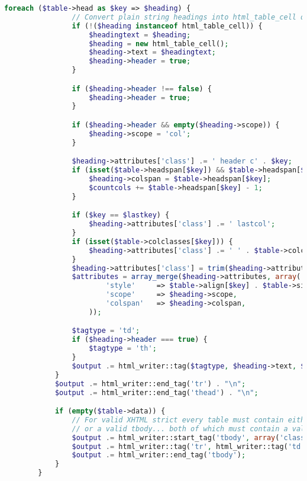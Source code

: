 \begin{lstlisting}[language=PHP]
            foreach ($table->head as $key => $heading) {
                // Convert plain string headings into html_table_cell objects
                if (!($heading instanceof html_table_cell)) {
                    $headingtext = $heading;
                    $heading = new html_table_cell();
                    $heading->text = $headingtext;
                    $heading->header = true;
                }

                if ($heading->header !== false) {
                    $heading->header = true;
                }

                if ($heading->header && empty($heading->scope)) {
                    $heading->scope = 'col';
                }

                $heading->attributes['class'] .= ' header c' . $key;
                if (isset($table->headspan[$key]) && $table->headspan[$key] > 1) {
                    $heading->colspan = $table->headspan[$key];
                    $countcols += $table->headspan[$key] - 1;
                }

                if ($key == $lastkey) {
                    $heading->attributes['class'] .= ' lastcol';
                }
                if (isset($table->colclasses[$key])) {
                    $heading->attributes['class'] .= ' ' . $table->colclasses[$key];
                }
                $heading->attributes['class'] = trim($heading->attributes['class']);
                $attributes = array_merge($heading->attributes, array(
                        'style'     => $table->align[$key] . $table->size[$key] . $heading->style,
                        'scope'     => $heading->scope,
                        'colspan'   => $heading->colspan,
                    ));

                $tagtype = 'td';
                if ($heading->header === true) {
                    $tagtype = 'th';
                }
                $output .= html_writer::tag($tagtype, $heading->text, $attributes) . "\n";
            }
            $output .= html_writer::end_tag('tr') . "\n";
            $output .= html_writer::end_tag('thead') . "\n";

            if (empty($table->data)) {
                // For valid XHTML strict every table must contain either a valid tr
                // or a valid tbody... both of which must contain a valid td
                $output .= html_writer::start_tag('tbody', array('class' => 'empty'));
                $output .= html_writer::tag('tr', html_writer::tag('td', '', array('colspan'=>count($table->head))));
                $output .= html_writer::end_tag('tbody');
            }
        }


\end{lstlisting}
